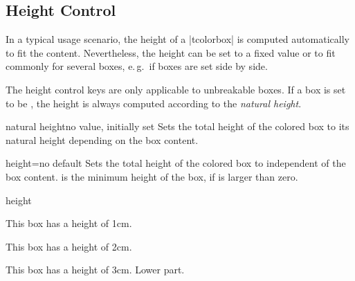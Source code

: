 \clearpage
\subsection{Height Control}\label{sec:heightcontrol}
In a typical usage scenario, the height of a |tcolorbox| is computed automatically
to fit the content. Nevertheless, the height can be set to a fixed value
or to fit commonly for several boxes, e.\,g.\ if boxes are set side by side.

\bigskip
\begin{marker}
  The height control keys are only applicable to unbreakable boxes.
  If a box is set to be , the height is always
  computed according to the \emph{natural height}.
\end{marker}
\bigskip


\begin{docTcbKey}{natural height}{}{no value, initially set}
  Sets the total height of the colored box to its natural height depending
  on the box content.
\end{docTcbKey}

\begin{docTcbKey}{height}{=}{no default}
  Sets the total height of the colored box to  independent
  of the box content.  is the minimum height of the box, if
   is larger than zero.
\begin{exdispExample}{height}

\begin{tcolorbox}[height=1cm,valign=center]
  This box has a height of 1cm.
\end{tcolorbox}
\begin{tcolorbox}[height=2cm,valign=center]
  This box has a height of 2cm.
\end{tcolorbox}
\begin{tcolorbox}[height=3cm,split=0.5,valign=center,valign lower=center]
  This box has a height of 3cm.
  \tcblower
  Lower part.
\end{tcolorbox}
\end{exdispExample}
\end{docTcbKey}


